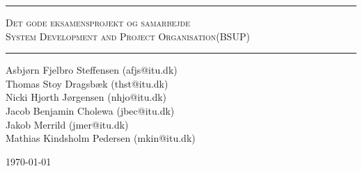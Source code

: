 \begin{titlepage}

\begin{center}

\topskip 7cm





\rule{\linewidth}{0.6mm}

\vspace{2mm}

\textsc{\LARGE Det gode eksamensprojekt og samarbejde} \\
\textsc{System Development and Project Organisation(BSUP)}
\vspace{1cm}
\rule{\linewidth}{0.4mm}

Asbj\o rn Fjelbro Steffensen (afjs@itu.dk)\\ Thomas Stoy Dragsb\ae k (thst@itu.dk)\\ Nicki Hjorth J\o rgensen (nhjo@itu.dk)\\ Jacob Benjamin Cholewa (jbec@itu.dk)\\ Jakob Merrild (jmer@itu.dk)\\ Mathias Kindsholm Pedersen (mkin@itu.dk)




\vfill

\large \today
\end{center}


\end{titlepage}